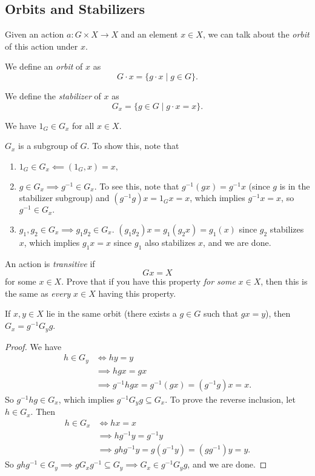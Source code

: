 \subsection{Orbits and Stabilizers}
Given an action $a \colon G\times X \to X$ and an element $x\in X$, we can talk about the \emph{orbit} of this action under $x$.
\begin{definition}[Orbits]
    We define an \emph{orbit} of $x$ as \[
    G\cdot x = \{g\cdot x \mid g\in G\}.
    \]
\end{definition}
\begin{definition}[Stabilizer]
    We define the \emph{stabilizer} of $x$ as \[
    G_x= \{g\in G \mid g\cdot x=x\} .
    \]
\end{definition}
\begin{remark}
 We have $1_G\in G_x$ for all $x\in X$. 
\end{remark}
\begin{claim}
    $G_x$ is a subgroup of $G$. To show this, note that
    \begin{enumerate}
        \item $1_G\in G_x \impliedby (1_G,x)=x,$
        \item $g\in G_x \implies g^{-1}\in G_x$. To see this, note that $g^{-1}(gx)=g^{-1}x$ (since $g$ is in the stabilizer subgroup) and $(g^{-1}g)x=1_{G}x=x$, which implies $g^{-1}x=x$, so $g^{-1}\in G_x.$
        \item $g_1,g_2\in G_x \implies g_1g_2\in G_x$. $(g_1g_2)x=g_1(g_2x)=g_1(x)$ since $g_2$ stabilizes $x$, which implies $g_1x=x$ since $g_1$ also stabilizes $x$, and we are done.
    \end{enumerate}
\end{claim}
\begin{definition}
    An action is \emph{transitive} if \[
    Gx=X
    \]
    for some $x\in X$. Prove that if you have this property \emph{for some} $x\in X$, then this is the same as \emph{every} $x\in X$ having this property.
\end{definition}
\begin{lemma}
    If $x,y \in X$ lie in the same orbit (there exists a $g \in G$ such that $gx=y$), then $G_x=g^{-1}G_yg$.
\end{lemma}
\begin{proof} We have
    \begin{align*}
        h\in G_y &\iff hy=y\\
                 &\implies hgx=gx\\ 
                 &\implies g^{-1}hgx=g^{-1}(gx)=(g^{-1}g)x=x.
    \end{align*}
        So $g^{-1}hg\in G_x$, which implies $g^{-1}G_yg \subseteq G_x$. To prove the reverse inclusion, let $h\in G_x$. Then 
    \begin{align*}
        h\in G_x &\iff hx=x\\
                 &\implies hg^{-1}y=g^{-1}y\\ 
                 &\implies ghg^{-1}y=g(g^{-1}y)=(gg^{-1})y=y.
    \end{align*}
    So $ghg^{-1}\in G_y \implies gG_xg^{-1}\subseteq G_y \implies G_x \in g^{-1}G_yg$, and we are done. 
\end{proof}
